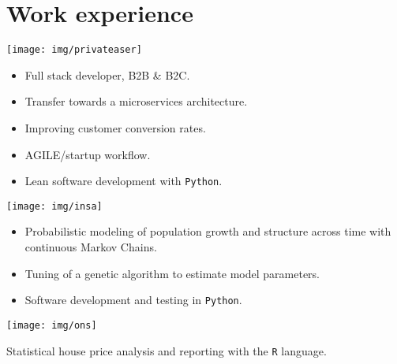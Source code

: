 \section{Work experience}

\noindent
\begin{minipage}{.15\textwidth}
\centerline{\texttt{[image: img/privateaser]}}
\end{minipage}%
\hspace{5mm}
\begin{minipage}{.8\textwidth}
\raggedright
    \begin{itemize}
        \itemsep0em
        \item Full stack developer, B2B \& B2C.
        \item Transfer towards a microservices architecture.
        \item Improving customer conversion rates.
        \item AGILE/startup workflow.
        \item Lean software development with \texttt{Python}.
    \end{itemize}
\end{minipage}

\noindent
\begin{minipage}{.15\textwidth}
\centerline{\texttt{[image: img/insa]}}
\end{minipage}%
\hspace{5mm}
\begin{minipage}{.8\textwidth}
\raggedright
    \begin{itemize}
        \itemsep0em
        \item Probabilistic modeling of population growth and structure across time with continuous Markov Chains.
        \item Tuning of a genetic algorithm to estimate model parameters.
        \item Software development and testing in \texttt{Python}.
    \end{itemize}
\end{minipage}

\noindent
\begin{minipage}{.15\textwidth}
\centerline{\texttt{[image: img/ons]}}
\end{minipage}%
\hspace{5mm}
\begin{minipage}{.8\textwidth}
\raggedright
    Statistical house price analysis and reporting with the \texttt{R} language.
\end{minipage}

